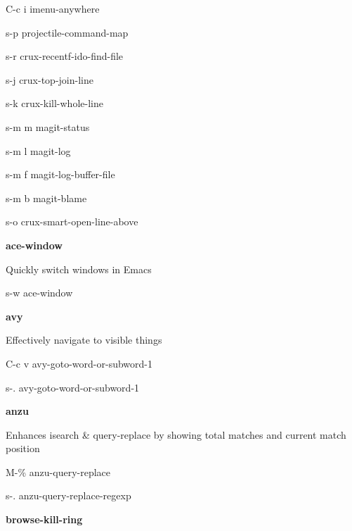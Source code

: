 \documentclass[10pt]{article}
\renewcommand\subsection[1]{\smallskip\par\textbf{\color{heading}#1}}
\newcommand\humanreadable[1]{{\par\color{default}\small\sffamily#1}}
\begin{document}
\begin{multicols}{4}
\begin{keylist}
  \item[C-c i] imenu-anywhere
  \item[s-p] projectile-command-map
  \item[s-r] crux-recentf-ido-find-file
  \item[s-j] crux-top-join-line
  \item[s-k] crux-kill-whole-line
  \item[s-m m] magit-status
  \item[s-m l] magit-log
  \item[s-m f] magit-log-buffer-file
  \item[s-m b] magit-blame
  \item[s-o] crux-smart-open-line-above
  \end{keylist}

  \subsection{ace-window}
  \humanreadable{Quickly switch windows in Emacs}
  \begin{keylist}
  \item[s-w] ace-window
  \end{keylist}

  \subsection{avy}

  \humanreadable{Effectively navigate to visible things}
  \begin{keylist}
  \item[C-c v] avy-goto-word-or-subword-1
  \item[s-.] avy-goto-word-or-subword-1
  \end{keylist}
  \subsection{anzu}

  \humanreadable{Enhances isearch \& query-replace by showing total matches and current match position}
  \begin{keylist}
  \item[M-\%] anzu-query-replace
  \item[s-.] anzu-query-replace-regexp
  \end{keylist}

  \subsection{browse-kill-ring}


\end{multicols}
\end{document}
